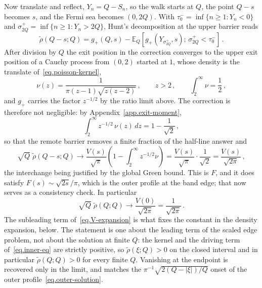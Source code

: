\documentclass[11pt,a4paper]{article}
\theoremstyle{definition}
\begin{document}
Now translate and reflect, $Y_n = Q - S_n$, so the walk starts at $Q$, the point
$Q-s$ becomes $s$, and the Fermi sea becomes $(0,2Q)$.  With
$\tau_0^- = \inf\{n\geq1 : Y_n<0\}$ and
$\sigma_{2Q}^+ = \inf\{n\geq1 : Y_n>2Q\}$, Hunt's decomposition at the upper
barrier reads
\begin{equation}\label{eq.hunt}
  \tilde\rho(Q-s;Q)
  = g_+(Q,s)
  - \mathbb{E}_Q \left[g_+ \left(Y_{\sigma^+_{2Q}},s\right);\,
    \sigma^+_{2Q} < \tau^-_0\right]\,.
\end{equation}
After division by $Q$ the exit position in the correction converges to the upper
exit position of a Cauchy process from $(0,2)$ started at $1$, whose density is
the translate of~\eqref{eq.poisson-kernel},
\begin{equation}\label{eq.upper-exit}
  \nu(z) = \frac{1}{\pi(z-1)\sqrt{z(z-2)}}\,,
  \qquad z>2\,,
  \qquad \int_2^{\infty}\nu = \frac12\,,
\end{equation}
and $g_+$ carries the factor $z^{-1/2}$ by the ratio limit above.  The
correction is therefore not negligible: by Appendix~\ref{app.exit-moment},
\begin{equation}\label{eq.overshoot-integral}
  \int_2^{\infty}z^{-1/2}\,\nu(z)\,dz = 1 - \frac{1}{\sqrt2}\,,
\end{equation}
so that the remote barrier removes a finite fraction of the half-line answer and
\begin{equation}\label{eq.F-from-hunt}
  \sqrt{Q}\;\tilde\rho(Q-s;Q)
  \longrightarrow \frac{V(s)}{\sqrt{\pi}}
    \left(1 - \int_2^{\infty}z^{-1/2}\nu\right)
  = \frac{V(s)}{\sqrt{\pi}}\cdot\frac{1}{\sqrt2}
  = \frac{V(s)}{\sqrt{2\pi}}\,,
\end{equation}
the interchange being justified by the global Green bound.  This is $F$, and it
does satisfy $F(s) \sim \sqrt{2s}/\pi$, which is the outer profile at the band
edge; that now serves as a consistency check.  In particular
\begin{equation}\label{eq.edge-amplitude}
  \sqrt{Q}\;\tilde\rho(Q;Q) \longrightarrow \frac{V(0)}{\sqrt{2\pi}}
  = \frac{1}{\sqrt{2\pi}} \, .
\end{equation}
The subleading term of~\eqref{eq.V-expansion} is what fixes
the constant in the density expansion, below.  The statement is
one about the leading term of the scaled edge problem, not about the solution
at finite $Q$: the kernel and the driving term of~\eqref{eq.inner-eq} are
strictly positive, so $\tilde\rho(\xi;Q) > 0$ on the closed interval and in
particular $\tilde\rho(Q;Q) > 0$ for every finite $Q$.  Vanishing at the
endpoint is recovered only in the limit, and matches the
$\pi^{-1}\sqrt{2(Q-|\xi|)/Q}$ onset of the outer
profile~\eqref{eq.outer-solution}.
\end{document}
